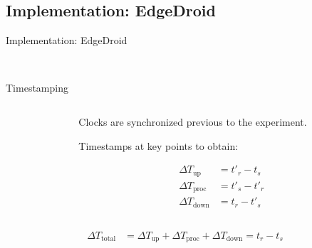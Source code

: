 \documentclass[aspectratio=1610]{beamer}
\begin{document}
\subsection{Implementation: EdgeDroid}
\begin{frame}{Implementation: EdgeDroid}
    \begin{center}
        \\
    \end{center}
\end{frame}

\begin{frame}{Timestamping}
    \begin{columns}[onlytextwidth]
        \begin{column}{.5\linewidth}
            \footnotesize%
            \raggedright%
            
        \end{column}%
        \begin{column}{.5\linewidth}
            Clocks are synchronized previous to the experiment.

            \vspace{\baselineskip}%
            Timestamps at key points to obtain:

            \begin{align}
                {\Delta}T_\text{up}   & = t'_{r} - t_{s}  \\
                {\Delta}T_\text{proc} & = t'_{s} - t'_{r} \\
                {\Delta}T_\text{down} & = t_{r} - t'_{s}
            \end{align}
        \end{column}%
    \end{columns}
    \begin{align}
        {\Delta}T_\text{total} & = {\Delta}T_\text{up} + {\Delta}T_\text{proc} + {\Delta}T_\text{down} = t_{r} - t_{s}
    \end{align}
\end{frame}
\end{document}
